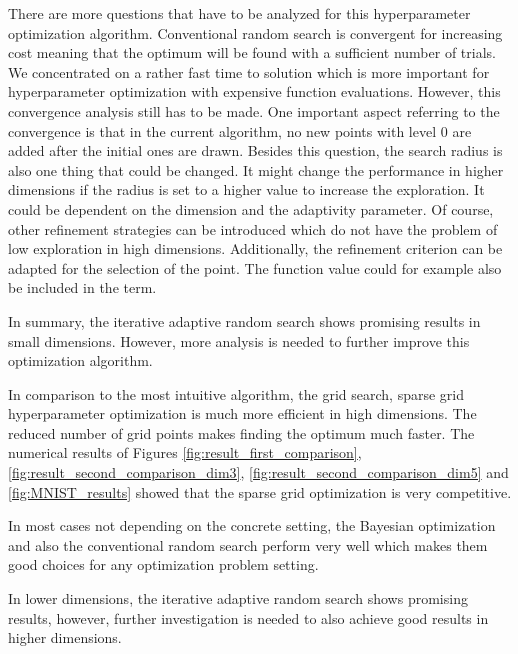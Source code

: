 There are more questions that have to be analyzed for this hyperparameter optimization algorithm. Conventional random search is convergent for increasing cost meaning that the optimum will be found with a sufficient number of trials. We concentrated on a rather fast time to solution which is more important for hyperparameter optimization with expensive function evaluations. However, this convergence analysis still has to be made. One important aspect referring to the convergence is that in the current algorithm, no new points with level 0 are added after the initial ones are drawn. Besides this question, the search radius is also one thing that could be changed. It might change the performance in higher dimensions if the radius is set to a higher value to increase the exploration. It could be dependent on the dimension and the adaptivity parameter. Of course, other refinement strategies can be introduced which do not have the problem of low exploration in high dimensions. Additionally, the refinement criterion can be adapted for the selection of the point. The function value could for example also be included in the term. 

In summary, the iterative adaptive random search shows promising results in small dimensions. However, more analysis is needed to further improve this optimization algorithm. \newline 

In comparison to the most intuitive algorithm, the grid search, sparse grid hyperparameter optimization is much more efficient in high dimensions. The reduced number of grid points makes finding the optimum much faster. The numerical results of Figures \ref{fig:result_first_comparison}, \ref{fig:result_second_comparison_dim3}, \ref{fig:result_second_comparison_dim5} and \ref{fig:MNIST_results} showed that the sparse grid optimization is very competitive. 

In most cases not depending on the concrete setting, the Bayesian optimization and also the conventional random search perform very well which makes them good choices for any optimization problem setting. 

In lower dimensions, the iterative adaptive random search shows promising results, however, further investigation is needed to also achieve good results in higher dimensions.


